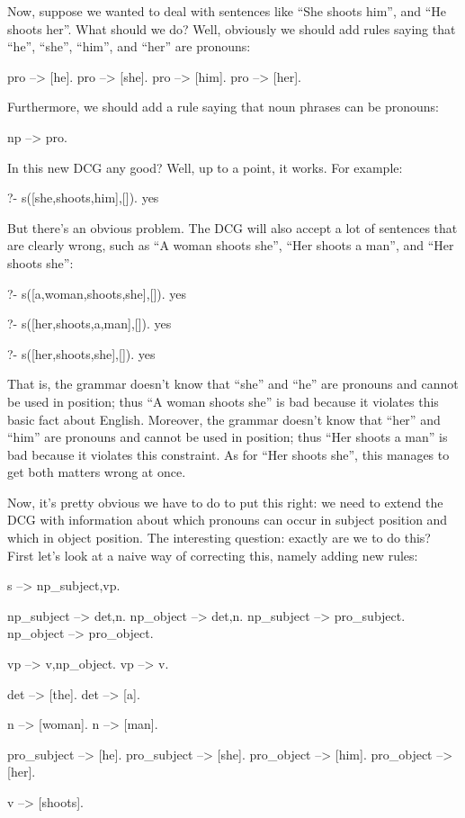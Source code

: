 Now, suppose we wanted to deal with sentences like ``She shoots him'',
and ``He shoots her''.  What should we do?  Well, obviously we should
add rules saying that ``he'', ``she'', ``him'', and ``her'' are
pronouns:
\begin{LPNcodedisplay}
pro --> [he].
pro --> [she].
pro --> [him].
pro --> [her].
\end{LPNcodedisplay}
Furthermore, we should add a rule saying that noun phrases can be
pronouns:
\begin{LPNcodedisplay}
np --> pro.
\end{LPNcodedisplay}

In this new DCG any good? Well, up to a point, it works. For example:
\begin{LPNcodedisplay}
?- s([she,shoots,him],[]).
yes
\end{LPNcodedisplay}

But there's an obvious problem.  The DCG will also accept a lot of
sentences that are clearly wrong, such as ``A woman shoots she'',
``Her shoots a man'', and ``Her shoots she'':
\begin{LPNcodedisplay}
?- s([a,woman,shoots,she],[]).
yes

?- s([her,shoots,a,man],[]).
yes

?- s([her,shoots,she],[]).
yes
\end{LPNcodedisplay}

That is, the grammar doesn't know that ``she'' and ``he'' are  pronouns and cannot be used in  position;
thus ``A woman shoots she'' is bad because it violates this basic fact
about English.  Moreover, the grammar doesn't know that ``her'' and
``him'' are  pronouns and cannot be used in  position; thus ``Her shoots a man'' is bad because it
violates this constraint.  As for ``Her shoots she'', this manages to
get both matters wrong at once.

Now, it's pretty obvious  we have to do to put this right:
we need to extend the DCG with information about which pronouns can
occur in subject position and which in object position.  The
interesting question:  exactly are we to do this?  First
let's look at a naive way of correcting this, namely adding new rules:

\begin{LPNcodedisplay}
s --> np_subject,vp.

np_subject --> det,n.
np_object  --> det,n.
np_subject --> pro_subject.
np_object  --> pro_object.

vp --> v,np_object.
vp --> v.

det --> [the].
det --> [a].

n --> [woman].
n --> [man].

pro_subject --> [he].
pro_subject --> [she].
pro_object --> [him].
pro_object --> [her].

v --> [shoots].
\end{LPNcodedisplay}



